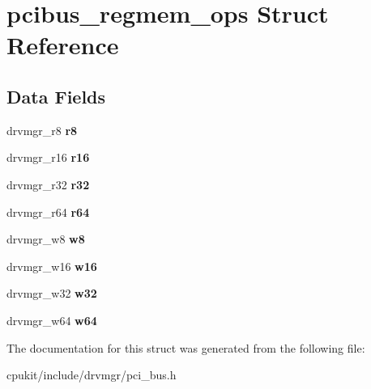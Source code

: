 \hypertarget{structpcibus__regmem__ops}{}\section{pcibus\+\_\+regmem\+\_\+ops Struct Reference}
\label{structpcibus__regmem__ops}
\subsection*{Data Fields}
\begin{DoxyCompactItemize}
\item 
\mbox{\label{structpcibus__regmem__ops_a0b3f00b10df123d50c841542731bc322}} 
drvmgr\+\_\+r8 {\bfseries r8}
\item 
\mbox{\label{structpcibus__regmem__ops_a23be2f03f765636b091185a351885b29}} 
drvmgr\+\_\+r16 {\bfseries r16}
\item 
\mbox{\label{structpcibus__regmem__ops_a18752f2dede25ce9cc5b0156d7ce3242}} 
drvmgr\+\_\+r32 {\bfseries r32}
\item 
\mbox{\label{structpcibus__regmem__ops_ac3ffdd3f506bac422a23f326d62fd335}} 
drvmgr\+\_\+r64 {\bfseries r64}
\item 
\mbox{\label{structpcibus__regmem__ops_afaa243dae8914671d862b663a4a4e4f6}} 
drvmgr\+\_\+w8 {\bfseries w8}
\item 
\mbox{\label{structpcibus__regmem__ops_aea78b6cdf5b1cce295f09cc0648bbadc}} 
drvmgr\+\_\+w16 {\bfseries w16}
\item 
\mbox{\label{structpcibus__regmem__ops_aef92098b37d9dfe1ebae9f936e965b16}} 
drvmgr\+\_\+w32 {\bfseries w32}
\item 
\mbox{\label{structpcibus__regmem__ops_acb5b09b99a9c70d839b3a9d8e3c8dcf3}} 
drvmgr\+\_\+w64 {\bfseries w64}
\end{DoxyCompactItemize}


The documentation for this struct was generated from the following file\+:\begin{DoxyCompactItemize}
\item 
cpukit/include/drvmgr/pci\+\_\+bus.\+h\end{DoxyCompactItemize}

